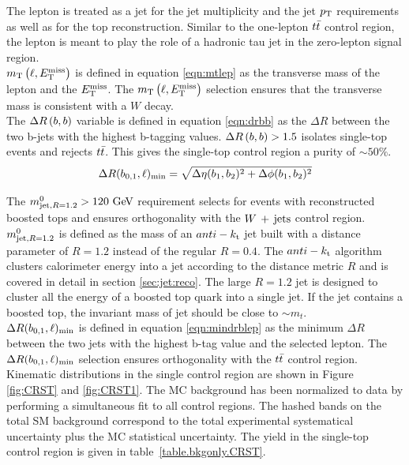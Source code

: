 \indent The lepton is treated as a jet for the jet multiplicity and the jet $p_{\mathrm{T}}$ requirements as well as for the top reconstruction.  Similar to the one-lepton $t\bar{t}$ control region, the lepton is meant to play the role of a hadronic tau jet in the zero-lepton signal region. \\

\indent $m_{\mathrm{T}}\left(\ell,E_{\mathrm{T}}^{\mathrm{miss}}\right)$ is defined in equation \ref{eqn:mtlep} as the transverse mass of the lepton and the $E_{\mathrm{T}}^{\mathrm{miss}}$.  The $m_{\mathrm{T}}\left(\ell,E_{\mathrm{T}}^{\mathrm{miss}}\right)$ selection ensures that the transverse mass is consistent with a $W$ decay.  \\

\indent The $\Delta R\left(b,b\right)$ variable is defined in equation \ref{eqn:drbb} as the $\Delta R$ between the two b-jets with the highest b-tagging values.  $\Delta R\left(b,b\right) > 1.5$ isolates single-top events and rejects $t\bar{t}$.  This gives the single-top control region a purity of $\sim50\%$. \\

\begin{equation}
\mindrblep = \sqrt{ \Delta\eta(b_1, b_2)^2 + \Delta\phi(b_1, b_2)^2}
\label{eqn:drbb}
\end{equation}

\indent The $\mantikttwelvezero > 120 \gev$ requirement selects for events with reconstructed boosted tops and ensures orthogonality with the $W\,+\,\mathrm{jets}$ control region.  $m^{0}_{\mathrm{jet,}R=1.2}$ is defined as the mass of an $anti-k_{\rm{t}}$ jet built with a distance parameter of $R=1.2$ instead of the regular $R=0.4$.  The $anti-k_{\rm{t}}$ algorithm clusters calorimeter energy into a jet according to the distance metric $R$ and is covered in detail in section \ref{sec:jet:reco}.  The large $R=1.2$ jet is designed to cluster all the energy of a boosted top quark into a single jet.  If the jet contains a boosted top, the invariant mass of jet should be close to $\sim m_t$.  \\

\indent $\Delta R(b_{0,1},\ell)_{\mathrm{min}}$ is defined in equation \ref{eqn:mindrblep} as the minimum $\Delta R$ between the two jets with the highest b-tag value and the selected lepton.  The $\Delta R(b_{0,1},\ell)_{\mathrm{min}}$ selection ensures orthogonality with the $t\bar{t}$ control region.  \\

\indent Kinematic distributions in the single control region are shown in Figure \ref{fig:CRST} and \ref{fig:CRST1}.  The MC background has been normalized to data by performing a simultaneous fit to all control regions.  The hashed bands on the total SM background correspond to the total experimental systematical uncertainty plus the MC statistical uncertainty.  The yield in the single-top control region is given in table~\ref{table.bkgonly.CRST}.  \\

